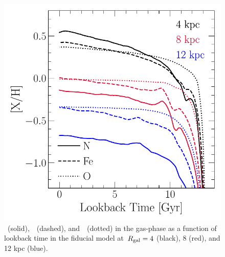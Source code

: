 \documentclass[ms.tex]{subfiles}
\begin{document}
\begin{figure}
\centering
\includegraphics[scale = 0.63]{nh_feh_vs_lookback.pdf}
\caption{
\nh~(solid),~\feh~(dashed), and~\oh~(dotted) in the gas-phase as a function of
lookback time in the fiducial model at~$R_\text{gal} = 4$ (black), 8 (red), and 12 kpc
(blue).
}
\label{fig:nh_feh_vs_lookback}
\end{figure}
\end{document}
